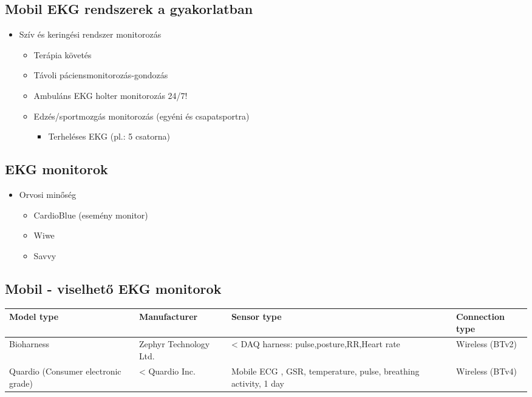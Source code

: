 \subsection{Mobil EKG rendszerek a gyakorlatban}
\begin{itemize}
    \item Szív és keringési rendszer monitorozás
    \begin{itemize}
        \item Terápia követés
        \item Távoli páciensmonitorozás-gondozás
        \item Ambuláns EKG holter monitorozás 24/7!
        \item Edzés/sportmozgás monitorozás (egyéni és csapatsportra) 
        \begin{itemize}
            \item Terheléses EKG (pl.: 5 csatorna)
        \end{itemize}
    \end{itemize}
\end{itemize}

\subsection{EKG monitorok}
\begin{itemize}
    \item Orvosi minőség
    \begin{itemize}
        \item CardioBlue (esemény monitor)
        \item Wiwe
        \item Savvy
    \end{itemize}
\end{itemize}

\subsection{Mobil - viselhető EKG monitorok}
\begin{table}[h!]
    \centering
    \footnotesize
    \begin{tabularx}{\textwidth}{|X|X|X|X|}
    \hline
    \textbf{Model type} & \textbf{Manufacturer} & \textbf{Sensor type} & \textbf{Connection type} \\ \hline
    Bioharness & Zephyr Technology Ltd. & < DAQ harness: pulse,posture,RR,Heart rate & Wireless (BTv2) \\ \hline
    Quardio (Consumer electronic grade) & < Quardio Inc. & Mobile ECG , GSR, temperature, pulse, breathing activity, 1 day & Wireless (BTv4) \\ \hline
    \end{tabularx}
    \label{your_label_here}
\end{table}

